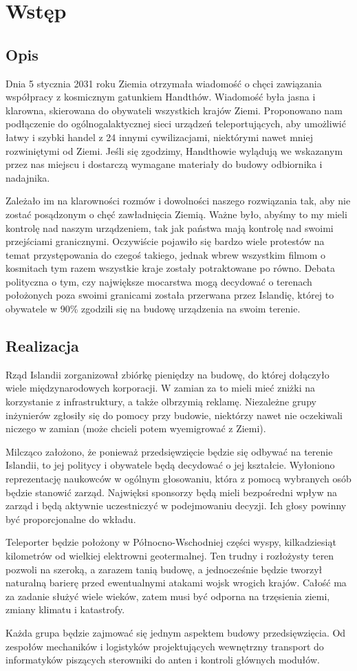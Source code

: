 \section{Wstęp}
\subsection{Opis}
Dnia 5 stycznia 2031 roku Ziemia otrzymała wiadomość o chęci zawiązania współpracy z kosmicznym gatunkiem Handthów.
Wiadomość była jasna i klarowna, skierowana do obywateli wszystkich krajów Ziemi.
Proponowano nam podłączenie do ogólnogalaktycznej sieci urządzeń teleportujących, aby umożliwić łatwy i szybki handel z 24 innymi cywilizacjami, niektórymi nawet mniej rozwiniętymi od Ziemi.
Jeśli się zgodzimy, Handthowie wylądują we wskazanym przez nas miejscu i dostarczą wymagane materiały do budowy odbiornika i nadajnika.

Zależało im na klarowności rozmów i dowolności naszego rozwiązania tak, aby nie zostać posądzonym o chęć zawładnięcia Ziemią.
Ważne było, abyśmy to my mieli kontrolę nad naszym urządzeniem, tak jak państwa mają kontrolę nad swoimi przejściami granicznymi.
Oczywiście pojawiło się bardzo wiele protestów na temat przystępowania do czegoś takiego, jednak wbrew wszystkim filmom o kosmitach tym razem wszystkie kraje zostały potraktowane po równo.
Debata polityczna o tym, czy największe mocarstwa mogą decydować o terenach położonych poza swoimi granicami została przerwana przez Islandię, której to obywatele w 90\% zgodzili się na budowę urządzenia na swoim terenie.

\subsection{Realizacja}
Rząd Islandii zorganizował zbiórkę pieniędzy na budowę, do której dołączyło wiele międzynarodowych korporacji.
W zamian za to mieli mieć zniżki na korzystanie z infrastruktury, a także olbrzymią reklamę.
Niezależne grupy inżynierów zgłosiły się do pomocy przy budowie, niektórzy nawet nie oczekiwali niczego w zamian (może chcieli potem wyemigrować z Ziemi).

Milcząco założono, że ponieważ przedsięwzięcie będzie się odbywać na terenie Islandii, to jej politycy i obywatele będą decydować o jej kształcie.
Wyłoniono reprezentację naukowców w ogólnym głosowaniu, która z pomocą wybranych osób będzie stanowić zarząd.
Najwięksi sponsorzy będą mieli bezpośredni wpływ na zarząd i będą aktywnie uczestniczyć w podejmowaniu decyzji.
Ich głosy powinny być proporcjonalne do wkładu.

Teleporter będzie położony w Północno-Wschodniej części wyspy, kilkadziesiąt kilometrów od wielkiej elektrowni geotermalnej.
Ten trudny i rozłożysty teren pozwoli na szeroką, a zarazem tanią budowę, a jednocześnie będzie tworzył naturalną barierę przed ewentualnymi atakami wojsk wrogich krajów.
Całość ma za zadanie służyć wiele wieków, zatem musi być odporna na trzęsienia ziemi, zmiany klimatu i katastrofy.

Każda grupa będzie zajmować się jednym aspektem budowy przedsięwzięcia.
Od zespołów mechaników i logistyków projektujących wewnętrzny transport do informatyków piszących sterowniki do anten i kontroli głównych modułów.
